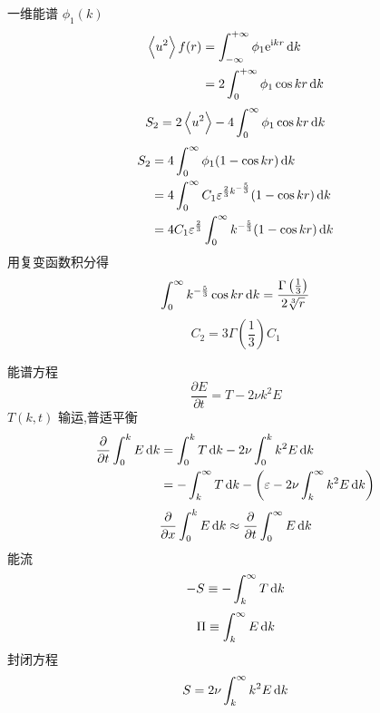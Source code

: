 \documentclass[12pt]{ctexart}
\begin{document}
一维能谱 $\phi_1(k)$
\begin{equation}
   \begin{aligned}
	  \left< u^2 \right> f(r) & = \int_{-\infty}^{+\infty} \phi_1 \me^{\mi kr} \dif k \\
							  &= 2 \int_{0}^{+\infty} \phi_1 \cos k r \dif k\\
   \end{aligned}
\end{equation}
\begin{equation}
   S_2 = 2 \left< u^2 \right>  - 4 \int_{0}^{\infty} \phi_1 \cos kr \dif k 
\end{equation}
\begin{equation}
   \begin{aligned}
	  S_2 & = 4 \int_{0}^{\infty} \phi_1(1- \cos kr) \dif k\\
		  &= 4 \int_{0}^{\infty} C_1 \varepsilon^{\frac{2}{3} k^{-\frac{5}{3}}} (1 - \cos kr ) \dif k \\
		  &= 4C_1 \varepsilon^{\frac{2}{3}} \int_{0}^{\infty} k^{-\frac{5}{3}} (1-\cos kr) \dif k 
   \end{aligned}
\end{equation}
用复变函数积分得
\begin{equation}
   \int_{0}^{\infty} k^{-\frac{5}{3}} \cos kr \dif k  = \frac{\Gamma \left( \frac{1}{3} \right) }{2\sqrt[3]{r} }
\end{equation}
\begin{equation}
   C_2 = 3 \Gamma\left(\frac{1}{3}\right) C_1
\end{equation}

能谱方程
\begin{equation}
   \frac{\partial E}{\partial t} = T - 2 \nu k^2E
\end{equation}
$T(k,t)$ 输运,普适平衡
\begin{equation}
   \begin{aligned}
	  \frac{\partial }{\partial t}  \int_{0}^{k} E \dif k & = \int_{0}^{k} T \dif k - 2 \nu \int_{0}^{k}  k^2 E \dif k \\
														  &= - \int_{k}^{\infty} T \dif k - \left( \varepsilon - 2 \nu \int_{k}^{\infty} k^2 E \dif k  \right)   \\
   \end{aligned}
\end{equation}
\begin{equation}
   \frac{\partial }{\partial x} \int_{0}^{k} E \dif k \approx \frac{\partial }{\partial t} \int_{0}^{\infty} E \dif k  
\end{equation}
能流
\begin{equation}
   - S \equiv - \int_{k}^{\infty} T \dif k 
\end{equation}
\begin{equation}
   \Pi \equiv \int_{k}^{\infty} E \dif k 
\end{equation}
封闭方程
\begin{equation}
   S = 2\nu \int_{k}^{\infty} k^2 E \dif k 
\end{equation}
\end{document}

